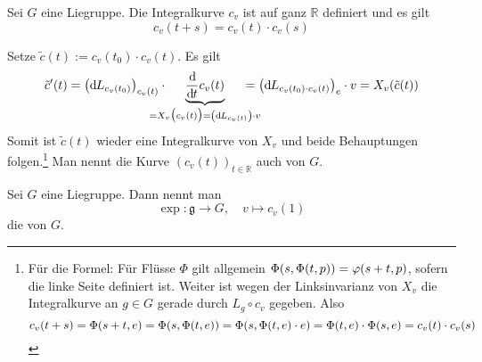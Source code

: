 \begin{lemma}[label=lem:127,{name=[Integralkurven sind Einparameteruntergruppen von $G$]}]
	Sei $G$ eine Liegruppe.
	Die Integralkurve $c_v$ ist auf ganz $\mathbb{R}$ definiert und es gilt 
	\[
		c_v(t+s) = c_v(t) \cdot c_v(s)
	\]
\end{lemma}
\begin{beweis}
	Setze $\tilde{c}(t) := c_v(t_0) \cdot c_v(t)$.
	Es gilt 
	\begin{align}
		\tilde{c}'(t) = \enbrace*{\mathd L_{c_v(t_0)}}_{c_v(t)}  \cdot \hspace{-1.5em}\Underbrace{\diffd{}{t} c_v(t)}{= X_v \enbrace[\big]{c_v(t)} = \enbrace*{\mathd L_{c_v(t)}} \cdot v} \hspace{-1.5em}= \enbrace*{\mathd L_{c_v(t_0) \cdot c_v(t)}}_e \cdot v = X_v \enbrace*{\tilde{c}(t)}
	\end{align}
	Somit ist $\tilde{c}(t)$ wieder eine Integralkurve von $X_v$ und beide Behauptungen folgen.\footnote{Für die Formel: Für Flüsse $\Phi$ gilt allgemein $\Phi\enbrace*{s, \Phi(t,p)} = \varphi(s+t,p)$, sofern die linke Seite definiert ist. Weiter ist wegen der Linksinvarianz von $X_v$ die Integralkurve an $g \in G$ gerade durch $L_g \circ c_v$ gegeben. Also
	\[
		c_v(t+s)= \Phi(s+t,e) = \Phi\enbrace*{s, \Phi(t,e)} = \Phi \enbrace*{s, \Phi(t,e) \cdot e} = \Phi(t,e) \cdot \Phi(s,e) = c_v(t) \cdot c_v(s)
	\]}
	Man nennt die Kurve $(c_v(t))_{t \in \mathbb{R}}$ auch  von $G$.
\end{beweis}

\begin{definition}[label=def:exp,{name=[Exponentialabbildung]}]
	Sei $G$ eine Liegruppe.
	Dann nennt man 
	\[
		\exp \colon \mathfrak{g} \longrightarrow G ,\quad  v \longmapsto c_v(1)
	\]
	die  von $G$. 
\end{definition}

